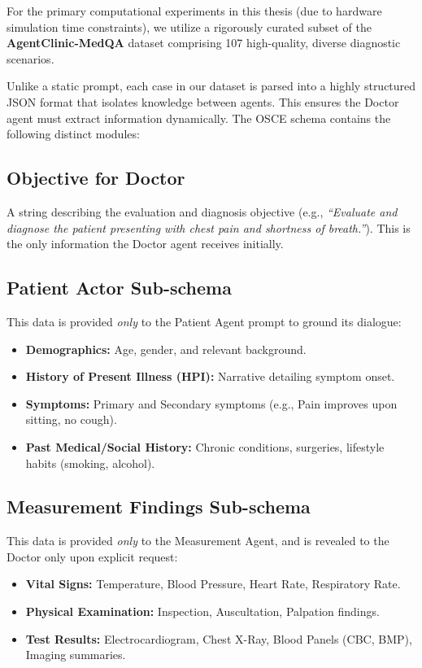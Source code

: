 \documentclass[12pt, a4paper, twoside]{report}
\begin{document}
For the primary computational experiments in this thesis (due to hardware simulation time constraints), we utilize a rigorously curated subset of the \textbf{AgentClinic-MedQA} dataset comprising 107 high-quality, diverse diagnostic scenarios.

Unlike a static prompt, each case in our dataset is parsed into a highly structured JSON format that isolates knowledge between agents. This ensures the Doctor agent must extract information dynamically. The OSCE schema contains the following distinct modules:

\subsection{Objective for Doctor}
A string describing the evaluation and diagnosis objective (e.g., \textit{``Evaluate and diagnose the patient presenting with chest pain and shortness of breath.''}). This is the only information the Doctor agent receives initially.

\subsection{Patient Actor Sub-schema}
This data is provided \textit{only} to the Patient Agent prompt to ground its dialogue:
\begin{itemize}
    \item \textbf{Demographics:} Age, gender, and relevant background.
    \item \textbf{History of Present Illness (HPI):} Narrative detailing symptom onset.
    \item \textbf{Symptoms:} Primary and Secondary symptoms (e.g., Pain improves upon sitting, no cough).
    \item \textbf{Past Medical/Social History:} Chronic conditions, surgeries, lifestyle habits (smoking, alcohol).
\end{itemize}

\subsection{Measurement Findings Sub-schema}
This data is provided \textit{only} to the Measurement Agent, and is revealed to the Doctor only upon explicit request:
\begin{itemize}
    \item \textbf{Vital Signs:} Temperature, Blood Pressure, Heart Rate, Respiratory Rate.
    \item \textbf{Physical Examination:} Inspection, Auscultation, Palpation findings.
    \item \textbf{Test Results:} Electrocardiogram, Chest X-Ray, Blood Panels (CBC, BMP), Imaging summaries.
\end{itemize}
\end{document}
